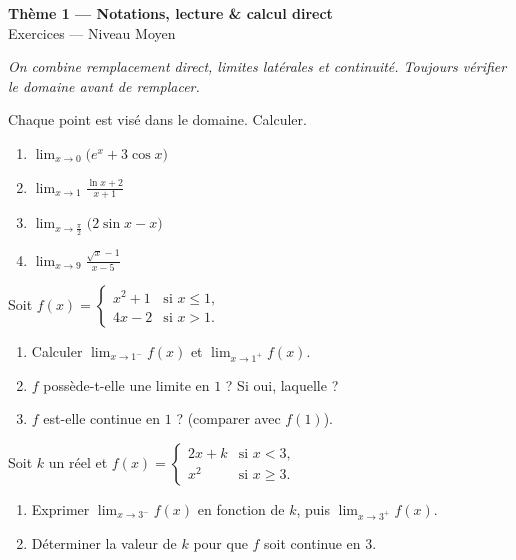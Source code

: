\documentclass[11pt,a4paper]{article}
\begin{document}
\begin{center}
{\Large\bfseries\color{primarydark}Thème 1 — Notations, lecture \& calcul direct}\\[2pt]
{\large\color{primary}Exercices — Niveau Moyen}
\end{center}
\vspace{4pt}
{\small\itshape On combine remplacement direct, limites latérales et continuité. Toujours vérifier le
domaine avant de remplacer.}
\vspace{6pt}

\begin{exercice}
Chaque point est visé dans le domaine. Calculer.
\begin{enumerate}[label=\alph*),leftmargin=2em,itemsep=3pt]
  \item $\displaystyle\lim_{x\to 0}\bigl(e^{x}+3\cos x\bigr)$
  \item $\displaystyle\lim_{x\to 1}\frac{\ln x + 2}{x+1}$
  \item $\displaystyle\lim_{x\to \frac{\pi}{2}}\bigl(2\sin x - x\bigr)$
  \item $\displaystyle\lim_{x\to 9}\frac{\sqrt{x}-1}{x-5}$
\end{enumerate}
\end{exercice}

\begin{exercice}
Soit $f(x)=\begin{cases} x^2+1 & \text{si } x\leq 1,\\[2pt] 4x-2 & \text{si } x>1.\end{cases}$
\begin{enumerate}[label=\alph*),leftmargin=2em,itemsep=3pt]
  \item Calculer $\displaystyle\lim_{x\to 1^{-}} f(x)$ et $\displaystyle\lim_{x\to 1^{+}} f(x)$.
  \item $f$ possède-t-elle une limite en $1$ ? Si oui, laquelle ?
  \item $f$ est-elle continue en $1$ ? (comparer avec $f(1)$).
\end{enumerate}
\end{exercice}

\begin{exercice}
Soit $k$ un réel et $f(x)=\begin{cases} 2x+k & \text{si } x<3,\\[2pt] x^2 & \text{si } x\geq 3.\end{cases}$
\begin{enumerate}[label=\alph*),leftmargin=2em,itemsep=3pt]
  \item Exprimer $\displaystyle\lim_{x\to 3^{-}} f(x)$ en fonction de $k$, puis $\displaystyle\lim_{x\to 3^{+}} f(x)$.
  \item Déterminer la valeur de $k$ pour que $f$ soit continue en $3$.
\end{enumerate}
\end{exercice}
\end{document}
